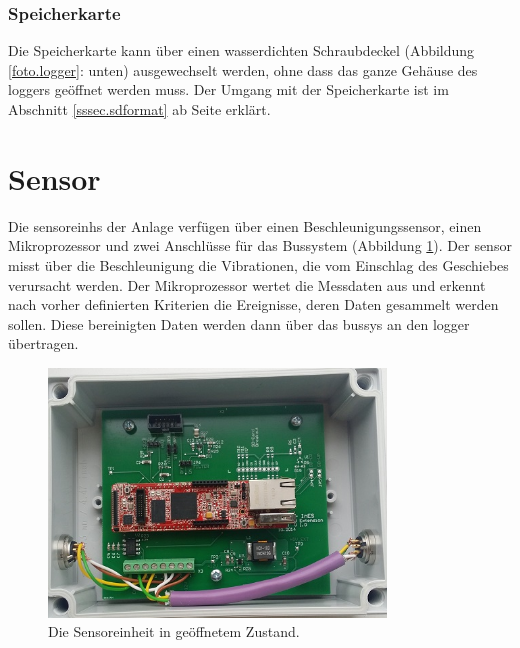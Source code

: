 \subsubsection{Speicherkarte}
Die Speicherkarte kann über einen wasserdichten Schraubdeckel (Abbildung \ref{foto.logger}: unten) ausgewechselt werden, ohne dass das ganze Gehäuse des \gls{logger}s geöffnet werden muss. Der Umgang mit der Speicherkarte ist im Abschnitt \ref{sssec.sdformat} ab Seite \pageref{sssec.sdformat} erklärt.











\section{Sensor}\label{sec.manualsensor}
Die \glspl{sensoreinh} der Anlage verfügen über einen Beschleunigungssensor, einen Mikroprozessor und zwei Anschlüsse für das Bussystem (Abbildung \ref{foto.sensoreinh}). Der \gls{sensor} misst über die Beschleunigung die Vibrationen, die vom Einschlag des Geschiebes verursacht werden. Der Mikroprozessor wertet die Messdaten aus und erkennt nach vorher definierten Kriterien die Ereignisse, deren Daten gesammelt werden sollen. Diese bereinigten Daten werden dann über das \gls{bussys} an den \gls{logger} übertragen.

\begin{figure}
	\centering
		\includegraphics[width=0.8\textwidth]{images/fotos/sensoreinh.png}
	\caption{Die Sensoreinheit in geöffnetem Zustand.}
	\label{foto.sensoreinh}
\end{figure}

